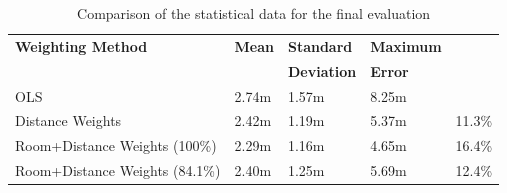 \begin{table}
\centering
\begin{tabular}{l l l l l}
\toprule
\textbf{Weighting Method}&\textbf{Mean}&\textbf{Standard}&\textbf{Maximum}\\
&&\textbf{Deviation}&\textbf{Error}\\
\midrule
OLS&2.74m&1.57m&8.25m&\\
Distance Weights&2.42m&1.19m&5.37m&11.3\%\\
Room+Distance Weights (100\%)&2.29m&1.16m&4.65m&16.4\%\\
Room+Distance Weights (84.1\%)&2.40m&1.25m&5.69m&12.4\%\\
\bottomrule
\end{tabular}
\caption[Final evaluation statistical values]{Comparison of the statistical data for the final evaluation}
\label{tab:FinalStatisticalValues}
\end{table}